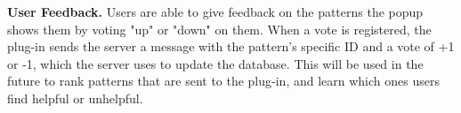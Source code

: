 {\bf User Feedback.} Users are able to give feedback on the patterns the popup shows them by voting "up" or "down" on them. When a vote is registered, the plug-in sends the server a message with the pattern's specific ID and a vote of +1 or -1, which the server uses to update the database. This will be used in the future to rank patterns that are sent to the plug-in, and learn which ones users find helpful or unhelpful.